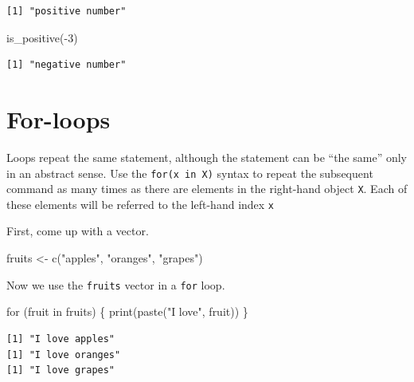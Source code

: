 \documentclass[
  letterpaper,
]{book}
\newenvironment{Shaded}{\begin{snugshade}}{\end{snugshade}}
\newcommand{\ControlFlowTok}[1]{\textcolor[rgb]{0.00,0.23,0.31}{#1}}
\newcommand{\DecValTok}[1]{\textcolor[rgb]{0.68,0.00,0.00}{#1}}
\newcommand{\FunctionTok}[1]{\textcolor[rgb]{0.28,0.35,0.67}{#1}}
\newcommand{\NormalTok}[1]{\textcolor[rgb]{0.00,0.23,0.31}{#1}}
\newcommand{\OtherTok}[1]{\textcolor[rgb]{0.00,0.23,0.31}{#1}}
\newcommand{\SpecialCharTok}[1]{\textcolor[rgb]{0.37,0.37,0.37}{#1}}
\newcommand{\StringTok}[1]{\textcolor[rgb]{0.13,0.47,0.30}{#1}}
\theoremstyle{definition}
\theoremstyle{definition}
\theoremstyle{plain}
\theoremstyle{definition}
\theoremstyle{plain}
\theoremstyle{plain}
\theoremstyle{remark}
\begin{document}
\begin{verbatim}
[1] "positive number"
\end{verbatim}

\begin{Shaded}
\begin{Highlighting}[]
\FunctionTok{is\_positive}\NormalTok{(}\SpecialCharTok{{-}}\DecValTok{3}\NormalTok{)}
\end{Highlighting}
\end{Shaded}

\begin{verbatim}
[1] "negative number"
\end{verbatim}

\hypertarget{for-loops}{%
\section{For-loops}\label{for-loops}}

Loops repeat the same statement, although the statement can be ``the
same'' only in an abstract sense. Use the \texttt{for(x\ in\ X)} syntax
to repeat the subsequent command as many times as there are elements in
the right-hand object \texttt{X}. Each of these elements will be
referred to the left-hand index \texttt{x}

First, come up with a vector.

\begin{Shaded}
\begin{Highlighting}[]
\NormalTok{fruits }\OtherTok{\textless{}{-}} \FunctionTok{c}\NormalTok{(}\StringTok{"apples"}\NormalTok{, }\StringTok{"oranges"}\NormalTok{, }\StringTok{"grapes"}\NormalTok{)}
\end{Highlighting}
\end{Shaded}

Now we use the \texttt{fruits} vector in a \texttt{for} loop.

\begin{Shaded}
\begin{Highlighting}[]
\ControlFlowTok{for}\NormalTok{ (fruit }\ControlFlowTok{in}\NormalTok{ fruits) \{}
  \FunctionTok{print}\NormalTok{(}\FunctionTok{paste}\NormalTok{(}\StringTok{"I love"}\NormalTok{, fruit))}
\NormalTok{\}}
\end{Highlighting}
\end{Shaded}

\begin{verbatim}
[1] "I love apples"
[1] "I love oranges"
[1] "I love grapes"
\end{verbatim}
\end{document}
